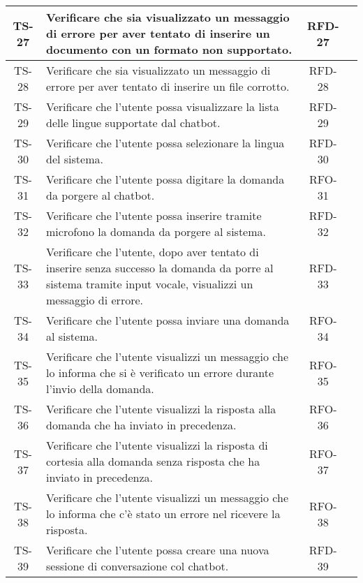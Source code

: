 \begin{xltabular}{\textwidth}{| c | X | c | c |}
    \hline
    TS-27 & Verificare che sia visualizzato un messaggio di errore per aver tentato di inserire un documento con un formato non supportato. & RFD-27 & \textcolor{xmarkcolor}{} \\
    \hline
    TS-28 & Verificare che sia visualizzato un messaggio di errore per aver tentato di inserire un file corrotto. & RFD-28 & \textcolor{xmarkcolor}{} \\
    \hline
    TS-29 & Verificare che l’utente possa visualizzare la lista delle lingue supportate dal chatbot. & RFD-29 & \textcolor{xmarkcolor}{} \\
    \hline
    TS-30 & Verificare che l’utente possa selezionare la lingua del sistema. & RFD-30 & \textcolor{xmarkcolor}{} \\
    \hline
    TS-31 & Verificare che l'utente possa digitare la domanda da porgere al chatbot. & RFO-31 & \textcolor{xmarkcolor}{} \\
    \hline
    TS-32 & Verificare che l'utente possa inserire tramite microfono la domanda da porgere al sistema. & RFD-32 & \textcolor{xmarkcolor}{} \\
    \hline
    TS-33 & Verificare che l’utente, dopo aver tentato di inserire senza successo la domanda da porre al sistema tramite input vocale, visualizzi un messaggio di errore. & RFD-33 & \textcolor{xmarkcolor}{} \\
    \hline
    TS-34 &  Verificare che l'utente possa inviare una domanda al sistema. & RFO-34 & \textcolor{xmarkcolor}{} \\
    \hline
    TS-35 & Verificare che l'utente visualizzi un messaggio che lo informa che si è verificato un errore durante l'invio della domanda. & RFO-35 & \textcolor{xmarkcolor}{} \\
    \hline
    TS-36 & Verificare che l’utente visualizzi la risposta alla domanda che ha inviato in precedenza. & RFO-36 & \textcolor{xmarkcolor}{} \\
    \hline
    TS-37 & Verificare che l’utente visualizzi la risposta di cortesia alla domanda senza risposta che ha inviato in precedenza. & RFO-37 & \textcolor{xmarkcolor}{} \\
    \hline
    TS-38 & Verificare che l'utente visualizzi un messaggio che lo informa che c'è stato un errore nel ricevere la risposta. & RFO-38 & \textcolor{xmarkcolor}{} \\
    \hline
    TS-39 & Verificare che l'utente possa creare una nuova sessione di conversazione col chatbot. & RFD-39 & \textcolor{xmarkcolor}{} \\

\end{xltabular}
